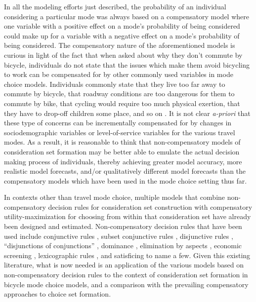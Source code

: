 In all the modeling efforts just described, the probability of an individual considering a particular mode was always based on a compensatory model where one variable with a positive effect on a mode's probability of being considered could make up for a variable with a negative effect on a mode's probability of being considered. The compensatory nature of the aforementioned models is curious in light of the fact that when asked about why they don't commute by bicycle, individuals do not state that the issues which make them avoid bicycling to work can be compensated for by other commonly used variables in mode choice models. Individuals commonly state that they live too far away to commute by bicycle, that roadway conditions are too dangerous for them to commute by bike, that cycling would require too much physical exertion, that they have to drop-off children some place, and so on \citep{goldsmith_reasons_1992, cleland_why_2004}. It is not clear  \textit{a-priori} that these type of concerns can be incrementally compensated for by changes in sociodemographic variables or level-of-service variables for the various travel modes. As a result, it is reasonable to think that non-compensatory models of consideration set formation may be better able to emulate the actual decision making process of individuals, thereby achieving greater model accuracy, more realistic model forecasts, and/or qualitatively different model forecasts than the compensatory models which have been used in the mode choice setting thus far.

In contexts other than travel mode choice, multiple models that combine non-compensatory decision rules for consideration set construction with compensatory utility-maximization for choosing from within that consideration set have already been designed and estimated. Non-compensatory decision rules that have been used include conjunctive rules \citep{swait_non-compensatory_2001, elrod_new_2004, gilbride_choice_2004}, subset conjunctive rules \citep{jedidi_probabilistic_2005}, disjunctive rules \citep{swait_non-compensatory_2001, elrod_new_2004, gilbride_choice_2004}, ``disjunctions of conjunctions'' \citep{hauser_disjunctions_2010}, dominance \citep{cascetta_dominance_2009}, elimination by aspects \citep{gilbride_estimating_2006}, economic screening \citep{gilbride_estimating_2006}, lexicographic rules \citep{kohli_representation_2007}, and satisficing  \citep{stuttgen_satisficing_2012} to name a few. Given this existing literature, what is now needed is an application of the various models based on non-compensatory decision rules to the context of consideration set formation in bicycle mode choice models, and a comparison with the prevailing compensatory approaches to choice set formation.

